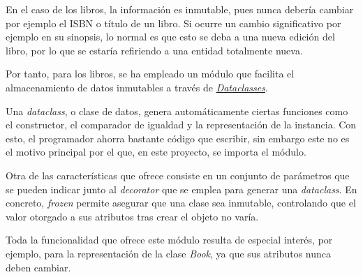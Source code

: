 En el caso de los libros, la información es inmutable, pues nunca debería cambiar por ejemplo el ISBN o título de un libro. Si ocurre un cambio significativo por ejemplo en su sinopsis, lo normal es que esto se deba a una nueva edición del libro, por lo que se estaría refiriendo a una entidad totalmente nueva.

Por tanto, para los libros, se ha empleado un módulo que facilita el almacenamiento de datos inmutables a través de  \href{https://docs.python.org/3/library/dataclasses.html}{\textit{Dataclasses}}.

Una \textit{dataclass}, o clase de datos, genera automáticamente ciertas funciones como el constructor, el comparador de igualdad y la representación de la instancia. Con esto, el programador ahorra bastante código que escribir, sin embargo este no es el motivo principal por el que, en este proyecto, se importa el módulo.

Otra de las características que ofrece consiste en un conjunto de parámetros que se pueden indicar junto al \textit{decorator} que se emplea para generar una \textit{dataclass}. En concreto, \textit{frozen} permite asegurar que una clase sea inmutable, controlando que el valor otorgado a sus atributos tras crear el objeto no varía.

Toda la funcionalidad que ofrece este módulo resulta de especial interés, por ejemplo, para la representación de la clase \textit{Book}, ya que sus atributos nunca deben cambiar.